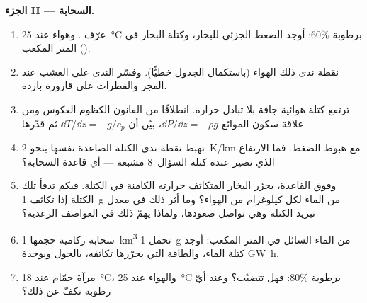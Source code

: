 \begin{problem}
\medskip
\noindent\textbf{الجزء II --- السحابة.}
\begin{enumerate}[resume]
  \item عرّف . وهواء عند \qty{25}{\degreeCelsius} برطوبة $60\%$:
        أوجد الضغط الجزئي للبخار، وكتلة البخار في المتر المكعب
        ().
  \item نقطة ندى ذلك الهواء (باستكمال الجدول خطيًّا). وفسّر الندى
        على العشب عند الفجر والقطرات على قارورة باردة.
  \item ترتفع كتلة هوائية جافة بلا تبادل حرارة. انطلاقًا من
        القانون الكظوم العكوس ومن علاقة سكون الموائع
        $\dd P/\dd z = -\rho g$، بيّن أن $\dd T/\dd z = -g/c_p$ ثم
        قدّرها.
  \item تهبط نقطة ندى الكتلة الصاعدة نفسها بنحو
        \qty{2}{K/km} مع هبوط الضغط. فما الارتفاع الذي تصير عنده كتلة
        السؤال~8 مشبعة --- أي قاعدة السحابة؟
  \item وفوق القاعدة، يحرّر البخار المتكاثف حرارته الكامنة
        في الكتلة. فبكم تدفأ تلك الكتلة إذا تكاثف \qty{1}{g} من
        الماء لكل كيلوغرام من الهواء؟ وما أثر ذلك في معدل
        تبريد الكتلة وهي تواصل صعودها، ولماذا يهمّ ذلك في العواصف الرعدية؟
  \item سحابة ركامية حجمها \qty{1}{km^3} تحمل \qty{1}{g} من الماء السائل في المتر
        المكعب: أوجد كتلة الماء، والطاقة التي يحرّرها
        تكاثفه، بالجول وبوحدة \unit{GW h}.
  \item مرآة حمّام عند \qty{18}{\degreeCelsius}، والهواء عند
        \qty{25}{\degreeCelsius} برطوبة $80\%$: فهل تتضبّب؟ وعند أيّ رطوبة
        تكفّ عن ذلك؟
\end{enumerate}


\end{problem}
